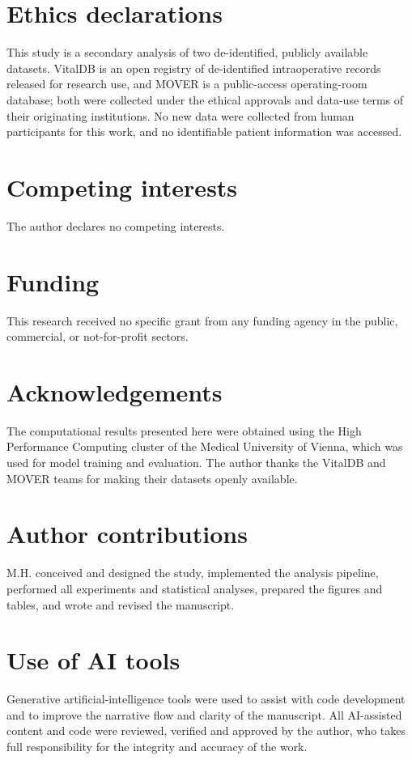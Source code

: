 \documentclass[11pt]{article}
\begin{document}
\section*{Ethics declarations}
This study is a secondary analysis of two de-identified, publicly available
datasets. VitalDB is an open registry of de-identified intraoperative
records released for research use, and MOVER is a public-access
operating-room database; both were collected under the ethical approvals and
data-use terms of their originating institutions. No new data were collected
from human participants for this work, and no identifiable patient
information was accessed.

\section*{Competing interests}
The author declares no competing interests.

\section*{Funding}
This research received no specific grant from any funding agency in the
public, commercial, or not-for-profit sectors.

\section*{Acknowledgements}
The computational results presented here were obtained using the High
Performance Computing cluster of the Medical University of Vienna, which was
used for model training and evaluation. The author thanks the VitalDB and
MOVER teams for making their datasets openly available.

\section*{Author contributions}
M.H. conceived and designed the study, implemented the analysis pipeline,
performed all experiments and statistical analyses, prepared the figures and
tables, and wrote and revised the manuscript.

\section*{Use of AI tools}
Generative artificial-intelligence tools were used to assist with code
development and to improve the narrative flow and clarity of the manuscript.
All AI-assisted content and code were reviewed, verified and approved by the
author, who takes full responsibility for the integrity and accuracy of the
work.




\clearpage

\end{document}
